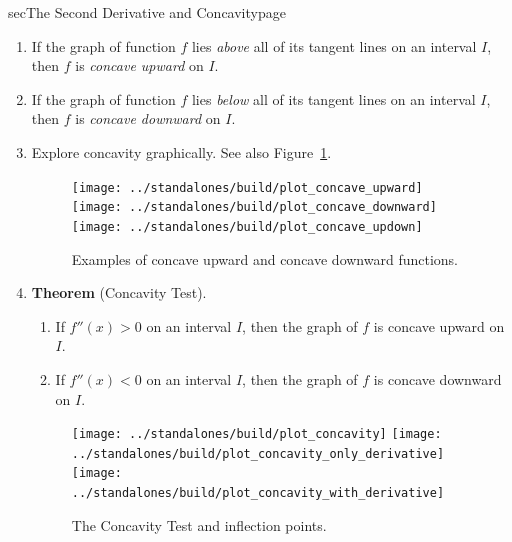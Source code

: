 \documentclass[../main]{subfiles}
\begin{document}
\begin{outline}{sec}{The Second Derivative and Concavity}{page}\label{outline:app_second_derivative}
  \begin{enumerate}
    \item If the graph of function \(f\) lies \emph{above} all of its tangent lines on an interval \(I\), then \(f\) is \emph{concave upward} on \(I\).
    \item If the graph of function \(f\) lies \emph{below} all of its tangent lines on an interval \(I\), then \(f\) is \emph{concave downward} on \(I\).

    \item Explore concavity graphically. See also Figure~\ref{fig:concavity}.
      \begin{figure}[h!]
        \centering
        \texttt{[image: ../standalones/build/plot\_concave\_upward]}
        \quad
        \texttt{[image: ../standalones/build/plot\_concave\_downward]}
        \quad
        \texttt{[image: ../standalones/build/plot\_concave\_updown]}
        \caption{Examples of concave upward and concave downward functions.}
        \label{fig:concavity}
      \end{figure}
    \item \textbf{Theorem} (Concavity Test). 
      \begin{mdframed}[style=simple]
        \begin{enumerate}[label=(\alph*)]
          \item If \(f''(x) > 0\) on an interval \(I\), then the graph of \(f\) is concave upward on \(I\).
          \item If \(f''(x) < 0\) on an interval \(I\), then the graph of \(f\) is concave downward on \(I\).
        \end{enumerate}

      \end{mdframed}
        
      \begin{figure}[h!]
        \centering
        \texttt{[image: ../standalones/build/plot\_concavity]}
        \quad
        \texttt{[image: ../standalones/build/plot\_concavity\_only\_derivative]}
        \quad
        \texttt{[image: ../standalones/build/plot\_concavity\_with\_derivative]}
        \caption{The Concavity Test and inflection points.}
        \label{fig:concavity_test}
      \end{figure}


\end{enumerate}
\end{outline}
\end{document}
